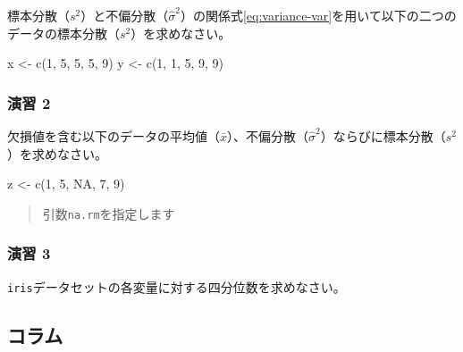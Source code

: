 \documentclass[
  12pt,
]{book}
\newenvironment{Shaded}{\begin{snugshade}}{\end{snugshade}}
\newcommand{\ConstantTok}[1]{\textcolor[rgb]{0.00,0.00,0.00}{#1}}
\newcommand{\DecValTok}[1]{\textcolor[rgb]{0.00,0.00,0.81}{#1}}
\newcommand{\FunctionTok}[1]{\textcolor[rgb]{0.00,0.00,0.00}{#1}}
\newcommand{\NormalTok}[1]{#1}
\newcommand{\OtherTok}[1]{\textcolor[rgb]{0.56,0.35,0.01}{#1}}
\begin{document}
標本分散（\(s^2\)）と不偏分散（\(\hat{\sigma}^2\)）の関係式\eqref{eq:variance-var}を用いて以下の二つのデータの標本分散（\(s^2\)）を求めなさい。

\begin{Shaded}
\begin{Highlighting}[numbers=left,,]
\NormalTok{x }\OtherTok{\textless{}{-}} \FunctionTok{c}\NormalTok{(}\DecValTok{1}\NormalTok{, }\DecValTok{5}\NormalTok{, }\DecValTok{5}\NormalTok{, }\DecValTok{5}\NormalTok{, }\DecValTok{9}\NormalTok{)}
\NormalTok{y }\OtherTok{\textless{}{-}} \FunctionTok{c}\NormalTok{(}\DecValTok{1}\NormalTok{, }\DecValTok{1}\NormalTok{, }\DecValTok{5}\NormalTok{, }\DecValTok{9}\NormalTok{, }\DecValTok{9}\NormalTok{)}
\end{Highlighting}
\end{Shaded}

\hypertarget{ux6f14ux7fd2-2}{%
\subsubsection*{演習 2}\label{ux6f14ux7fd2-2}}

欠損値を含む以下のデータの平均値（\(\bar{x}\)）、不偏分散（\(\hat{\sigma}^2\)）ならびに標本分散（\(s^2\)）を求めなさい。

\begin{Shaded}
\begin{Highlighting}[numbers=left,,]
\NormalTok{z }\OtherTok{\textless{}{-}} \FunctionTok{c}\NormalTok{(}\DecValTok{1}\NormalTok{, }\DecValTok{5}\NormalTok{, }\ConstantTok{NA}\NormalTok{, }\DecValTok{7}\NormalTok{, }\DecValTok{9}\NormalTok{)}
\end{Highlighting}
\end{Shaded}

\begin{quote}
引数\texttt{na.rm}を指定します
\end{quote}

\hypertarget{ux6f14ux7fd2-3}{%
\subsubsection*{演習 3}\label{ux6f14ux7fd2-3}}

\texttt{iris}データセットの各変量に対する四分位数を求めなさい。

\newpage

\hypertarget{ux30b3ux30e9ux30e0}{%
\subsection*{コラム}\label{ux30b3ux30e9ux30e0}}
\end{document}
